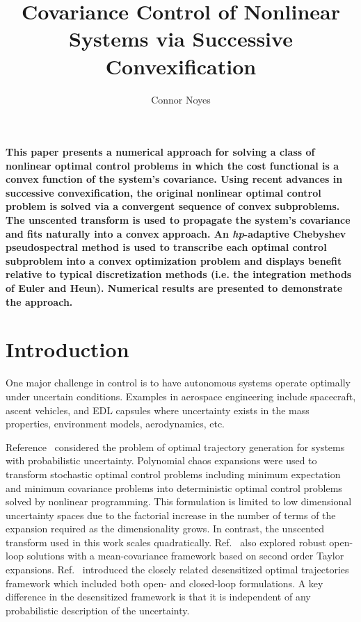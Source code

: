\documentclass[10pt,a4paper]{article}
\author{Connor Noyes}
\title{Covariance Control of Nonlinear Systems via Successive Convexification}
\begin{document}
	\maketitle




	\section*{}
	\textbf{This paper presents a numerical approach for solving a class of nonlinear optimal control problems in which the cost functional is a convex function of the system's covariance. Using recent advances in successive convexification, the original nonlinear optimal control problem is solved via a convergent sequence of convex subproblems. The unscented transform is used to propagate the system's covariance and fits naturally into a convex approach. An \textit{hp}-adaptive Chebyshev pseudospectral method is used to transcribe each optimal control subproblem into a convex optimization problem and displays benefit relative to typical discretization methods (i.e. the integration methods of Euler and Heun). Numerical results are presented to demonstrate the approach.}
	
	\section{Introduction}
	One major challenge in control is to have autonomous systems operate optimally under uncertain conditions. Examples in aerospace engineering include spacecraft, ascent vehicles, and EDL capsules where uncertainty exists in the mass properties, environment models, aerodynamics, etc.

	Reference~\cite{PCE_OCP_Bhattacharya} considered the problem of optimal trajectory generation for systems with probabilistic uncertainty. Polynomial chaos expansions were used to transform stochastic optimal control problems including minimum expectation and minimum covariance problems into deterministic optimal control problems solved by nonlinear programming. This formulation is limited to low dimensional uncertainty spaces due to the factorial increase in the number of terms of the expansion required as the dimensionality grows. In contrast, the unscented transform used in this work scales quadratically. Ref.~\cite{OpenLoopUncertain} also explored robust open-loop solutions with a mean-covariance framework based on second order Taylor expansions. Ref.~\cite{Desensitized} introduced the closely related desensitized optimal trajectories framework which included both open- and closed-loop formulations. A key difference in the desensitized framework is that it is independent of any probabilistic description of the uncertainty.
	
\end{document}
